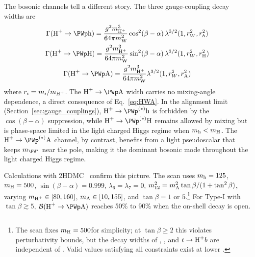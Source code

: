 The bosonic channels tell a different story. The three gauge-coupling decay widths are~\cite{Branco:2011iw,Gunion:1990dt,Eriksson:2009ws}
\begin{gather}
\Gamma(\PHp \to \PWp \Ph) = \frac{g^2 \mHc^3}{64\pi \mW^2} \cos^2(\beta - \alpha) \, \lambda^{3/2}(1, r_W^2, r_h^2) \label{eq:Gamma_Hpm_Wh} \\
\Gamma(\PHp \to \PWp \PH) = \frac{g^2 \mHc^3}{64\pi \mW^2} \sin^2(\beta - \alpha) \, \lambda^{3/2}(1, r_W^2, r_\PH^2) \label{eq:Gamma_Hpm_WH} \\
\Gamma(\PHp \to \PWp \PA) = \frac{g^2 \mHc^3}{64\pi \mW^2} \lambda^{3/2}(1, r_W^2, r_\PA^2) \label{eq:Gamma_Hpm_WA}
\end{gather}
where $r_i = m_i/m_{\text{H}^+}$. The $\PHp \to \PWp \PA$ width carries no mixing-angle dependence, a direct consequence of Eq.~\ref{eq:HWA}. In the alignment limit (Section~\ref{sec:gauge_couplings}), $\PHp \to \PWp^{(*)} \Ph$ is forbidden by the $\cos(\beta-\alpha)$ suppression, while $\PHp \to \PWp^{(*)} \PH$ remains allowed by mixing but is phase-space limited in the light charged Higgs regime when $m_{\text{h}} < m_{\text{H}}$. The $\PHp \to \PWp^{(*)} \PA$ channel, by contrast, benefits from a light pseudoscalar that keeps $m_{\PW^*}$ near the \PW pole, making it the dominant bosonic mode throughout the light charged Higgs regime.

Calculations with 2HDMC~\cite{Eriksson:2009ws} confirm this picture. The scan uses $m_{\text{h}} = 125$\GeV, $m_{\text{H}} = 500$\GeV, $\sin(\beta - \alpha) = 0.999$, $\lambda_6 = \lambda_7 = 0$, $m_{12}^2 = m_{\text{A}}^2 \tan\beta / (1 + \tan^2\beta)$, varying $m_{\text{H}^+} \in [80, 160]$\GeV, $m_{\text{A}} \in [10, 155]$\GeV, and $\tan\beta = 1$ or $5$.\footnote{The scan fixes $m_{\text{H}} = 500$\GeV for simplicity; at $\tan\beta \geq 2$ this violates perturbativity bounds, but the decay widths of \PHp, \PA, and $t \to \text{H}^+ b$ are independent of \mH. Valid \mH values satisfying all constraints exist at lower \mH.} For Type-I with $\tan\beta \gtrsim 5$, $\mathcal{B}(\PHp \to \PWp \PA)$ reaches 50\% to 90\% when the on-shell decay is open.

